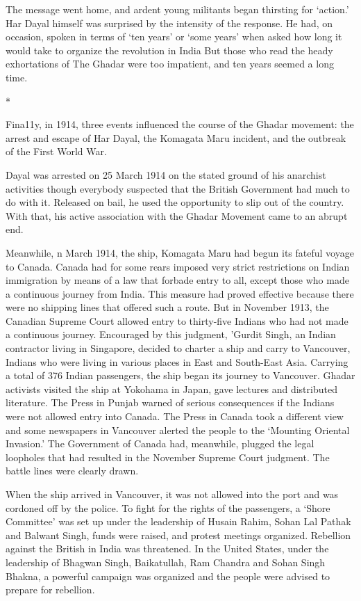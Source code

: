 The message went home, and ardent young militants began thirsting for ‘action.’ Har Dayal himself was surprised by the intensity of the response. He had, on occasion, spoken in terms of ‘ten years’ or ‘some years’ when asked how long it would take to organize the revolution in India But those who read the heady exhortations of The Ghadar were too impatient, and ten years seemed a long time.

\begin{center}*\end{center}



Fina11y, in 1914, three events influenced the course of the Ghadar movement: the arrest and escape of Har Dayal, the Komagata Maru incident, and the outbreak of the First World War.

Dayal was arrested on 25 March 1914 on the stated ground of his anarchist activities though everybody suspected that the British Government had much to do with it. Released on bail, he used the opportunity to slip out of the country. With that, his active association with the Ghadar Movement came to an abrupt end.

Meanwhile, n March 1914, the ship, Komagata Maru had begun its fateful voyage to Canada. Canada had for some rears imposed very strict restrictions on Indian immigration by means of a law that forbade entry to all, except those who made a continuous journey from India. This measure had proved effective because there were no shipping lines that offered such a route. But in November 1913, the Canadian Supreme Court allowed entry to thirty-five Indians who had not made a continuous journey. Encouraged by this judgment, ’Gurdit Singh, an Indian contractor living in Singapore, decided to charter a ship and carry to Vancouver, Indians who were living in various places in East and South-East Asia. Carrying a total of 376 Indian passengers, the ship began its journey to Vancouver. Ghadar activists visited the ship at Yokohama in Japan, gave lectures and distributed literature. The Press in Punjab warned of serious consequences if the Indians were not allowed entry into Canada. The Press in Canada took a different view and some newspapers in Vancouver alerted the people to the ‘Mounting Oriental Invasion.’ The Government of Canada had, meanwhile, plugged the legal loopholes that had resulted in the November Supreme Court judgment. The battle lines were clearly drawn.

When the ship arrived in Vancouver, it was not allowed into the port and was cordoned off by the police. To fight for the rights of the passengers, a ‘Shore Committee’ was set up under the leadership of Husain Rahim, Sohan Lal Pathak and Balwant Singh, funds were raised, and protest meetings organized. Rebellion against the British in India was threatened. In the United States, under the leadership of Bhagwan Singh, Baikatullah, Ram Chandra and Sohan Singh Bhakna, a powerful campaign was organized and the people were advised to prepare for rebellion.


